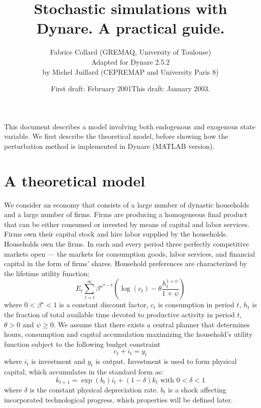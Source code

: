 \documentclass[11pt,a4paper]{article}
\begin{document}
\title{Stochastic simulations with {\sc Dynare}. A practical guide.}
\author{Fabrice Collard (GREMAQ, University of Toulouse)\\Adapted for Dynare 2.5.2\\ by Michel Juillard (CEPREMAP and University Paris 8)}
\date{First draft: February 2001\hspace{10mm}This draft: January 2003.}
\maketitle
This document describes a model involving both endogenous and exogenous state variable. We first describe the theoretical model, before showing how the perturbation method is implemented in {\sc Dynare} (MATLAB version). 

\section{A theoretical model} 
We consider an economy that consists of a large number of dynastic households and a large number of firms. Firms are producing a homogeneous final product that can be either consumed or invested by means of capital and labor services. Firms own their capital stock and hire labor supplied by the households. Households own the firms. In each and every period three perfectly competitive markets open --- the markets for consumption goods, labor services, and financial capital in the form of firms' shares. 
Household preferences are characterized by the lifetime utility function:
\begin{equation}
  E_t\sum_{\tau=t}^{\infty}{\beta^\star}^{\tau-t} \left(\log(c_t)-\theta\frac{h_t^{1+\psi}}{1+\psi}\right)
  \label{eq:ut}
\end{equation}
\noindent where $0<\beta^\star<1$ is a constant discount factor, $c_t$ is consumption in period
$t$, $h_t$ is the fraction of total available time devoted to productive activity in period $t$, $\theta>0$ and $\psi\geqslant 0$. We assume that there exists a central planner that determines hours, consumption and capital accumulation maximizing the household's utility function subject to the following budget constraint 
\begin{equation}
  c_t+i_t=y_t
  \label{eq:bud}
\end{equation}
\noindent where $i_t$ is investment and $y_t$ is output. Investment is used to form physical capital, which accumulates in the standard form as:
\begin{equation}
k_{t+1}=\exp(b_t) i_t+(1-\delta)k_t \mbox{ with } 0<\delta<1
\label{eq:acc}
\end{equation}
where $\delta$ is the constant physical depreciation rate. $b_t$ is a shock affecting incorporated technological progress, which properties will be defined later.
\end{document}

